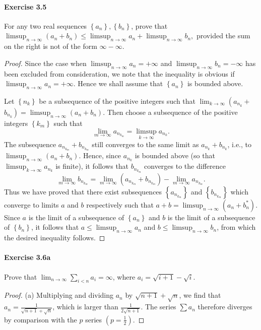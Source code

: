 \documentclass{article}
\theoremstyle{definition}
\begin{document}
\paragraph{Exercise 3.5} For any two real sequences $\left\{a_{n}\right\},\left\{b_{n}\right\}$, prove that $\limsup _{n \rightarrow \infty}\left(a_{n}+b_{n}\right) \leq \limsup _{n \rightarrow \infty} a_{n}+\limsup _{n \rightarrow \infty} b_{n},$ provided the sum on the right is not of the form $\infty-\infty$.
\begin{proof}
    Since the case when $\limsup _{n \rightarrow \infty} a_n=+\infty$ and $\limsup _{n \rightarrow \infty} b_n=-\infty$ has been excluded from consideration, we note that the inequality is obvious if $\limsup _{n \rightarrow \infty} a_n=+\infty$. Hence we shall assume that $\left\{a_n\right\}$ is bounded above.

Let $\left\{n_k\right\}$ be a subsequence of the positive integers such that $\lim _{k \rightarrow \infty}\left(a_{n_k}+\right.$ $\left.b_{n_k}\right)=\limsup _{n \rightarrow \infty}\left(a_n+b_n\right)$. Then choose a subsequence of the positive integers $\left\{k_m\right\}$ such that
$$
\lim _{m \rightarrow \infty} a_{n_{k_m}}=\limsup _{k \rightarrow \infty} a_{n_k} .
$$
The subsequence $a_{n_{k_m}}+b_{n_{k_m}}$ still converges to the same limit as $a_{n_k}+b_{n_k}$, i.e., to $\limsup _{n \rightarrow \infty}\left(a_n+b_n\right)$. Hence, since $a_{n_k}$ is bounded above (so that $\limsup _{k \rightarrow \infty} a_{n_k}$ is finite), it follows that $b_{n_{k_m}}$ converges to the difference
$$
\lim _{m \rightarrow \infty} b_{n_{k_m}}=\lim _{m \rightarrow \infty}\left(a_{n_{k_m}}+b_{n_{k_m}}\right)-\lim _{m \rightarrow \infty} a_{n_{k_m}} .
$$
Thus we have proved that there exist subsequences $\left\{a_{n_{k_m}}\right\}$ and $\left\{b_{n_{k_m}}\right\}$ which converge to limits $a$ and $b$ respectively such that $a+b=\limsup _{n \rightarrow \infty}\left(a_n+b_n^*\right)$. Since $a$ is the limit of a subsequence of $\left\{a_n\right\}$ and $b$ is the limit of a subsequence of $\left\{b_n\right\}$, it follows that $a \leq \limsup _{n \rightarrow \infty} a_n$ and $b \leq \limsup _{n \rightarrow \infty} b_n$, from which the desired inequality follows.
\end{proof}



\paragraph{Exercise 3.6a} Prove that $\lim_{n \rightarrow \infty} \sum_{i<n} a_i = \infty$, where $a_i = \sqrt{i + 1} -\sqrt{i}$.
\begin{proof}
    (a) Multiplying and dividing $a_n$ by $\sqrt{n+1}+\sqrt{n}$, we find that $a_n=\frac{1}{\sqrt{n+1}+\sqrt{n}}$, which is larger than $\frac{1}{2 \sqrt{n+1}}$. The series $\sum a_n$ therefore diverges by comparison with the $p$ series $\left(p=\frac{1}{2}\right)$.
\end{proof}
\end{document}
